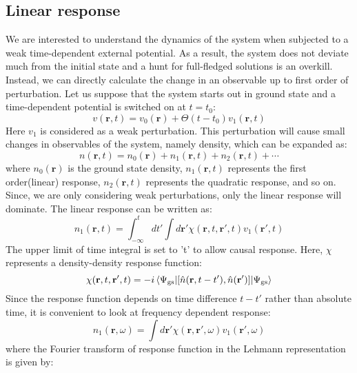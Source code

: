 \subsection{Linear response}
We are interested to understand the dynamics of the system when subjected to a weak time-dependent external potential. As a result, the system does not deviate much from the initial state and a hunt for full-fledged solutions is an overkill. Instead, we can directly calculate the change in an observable up to first order of perturbation. Let us suppose that the system starts out in ground state and a time-dependent potential is switched on at $t=t_0$:
\begin{equation}
    v(\mathbf{r},t) = v_0(\mathbf{r}) + \Theta(t-t_0)v_1(\mathbf{r},t)
\end{equation}
Here $v_1$ is considered as a weak perturbation. This perturbation will cause small changes in observables of the system, namely density, which can be expanded as:
\begin{equation}
    n(\mathbf{r},t) = n_0(\mathbf{r}) + n_1(\mathbf{r},t) + n_2(\mathbf{r},t) + \cdots
\end{equation}
where $n_0(\mathbf{r})$ is the ground state density, $n_1(\mathbf{r},t)$ represents the first order(linear) response, $n_2(\mathbf{r},t)$ represents the quadratic response, and so on. Since, we are only considering weak perturbations, only the linear response will dominate. The linear response can be written as:
\begin{equation}\label{linear_response}
    n_1(\mathbf{r},t) = \int_{-\infty}^tdt'\int d\mathbf{r}'\chi(\mathbf{r},t,\mathbf{r}',t)v_1(\mathbf{r}',t)
\end{equation}
The upper limit of time integral is set to 't' to allow causal response. Here, $\chi$ represents a density-density response function:
\begin{equation}\label{response_function}
    \chi(\mathbf{r},t,\mathbf{r}',t) = -i\ev**{[\hat{n}(\mathbf{r},t-t'),\hat{n}(\mathbf{r}')]}{\Psi_{\text{gs}}}
\end{equation}
Since the response function depends on time difference $t-t'$ rather than absolute time, it is convenient to look at  frequency dependent response:
\begin{equation}\label{freq_response_function}
     n_1(\mathbf{r},\omega) = \int d\mathbf{r'} \chi(\mathbf{r},\mathbf{r}',\omega)v_1(\mathbf{r}',\omega) 
\end{equation}
where the Fourier transform of response function in the Lehmann representation is given by:
